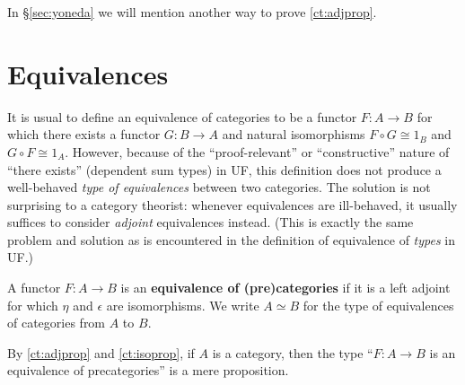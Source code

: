 \documentclass{amsart}
\theoremstyle{definition}
\theoremstyle{remark}
\numberwithin{equation}{section}
\begin{document}
In \S\ref{sec:yoneda} we will mention another way to prove \autoref{ct:adjprop}.


\section{Equivalences}
\label{sec:equivalences}

It is usual to define an equivalence of categories to be a functor $F:A\to B$ for which there exists a functor $G:B\to A$ and natural isomorphisms $F\circ G \cong 1_B$ and $G\circ F \cong 1_A$.
However, because of the ``proof-relevant'' or ``constructive'' nature of ``there exists'' (dependent sum types) in UF, this definition does not produce a well-behaved \emph{type of equivalences} between two categories.
The solution is not surprising to a category theorist: whenever equivalences are ill-behaved, it usually suffices to consider \emph{adjoint} equivalences instead.
(This is exactly the same problem and solution as is encountered in the definition of equivalence of \emph{types} in UF.)

\begin{defn}
  A functor $F:A\to B$ is an \textbf{equivalence of (pre)categories} if it is a left adjoint for which $\eta$ and $\epsilon$ are isomorphisms.
  We write $A\simeq B$ for the type of equivalences of categories from $A$ to $B$.
\end{defn}

By \autoref{ct:adjprop} and \autoref{ct:isoprop}, if $A$ is a category, then the type ``$F:A\to B$ is an equivalence of precategories'' is a mere proposition.
\end{document}
